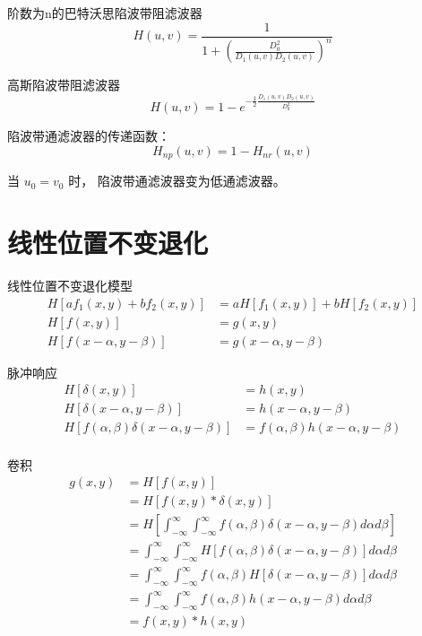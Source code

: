 \documentclass[presentation]{beamer}
\begin{document}
\begin{frame}[label={sec:orgfc7fb33}]{阶数为n的巴特沃思陷波带阻滤波器}
\[ H(u,v)=\frac{1}{1+\left(\frac{D_0^2}{D_1(u,v)D_2(u,v)}\right)^n} \]
\end{frame}

\begin{frame}[label={sec:orgc35f731}]{高斯陷波带阻滤波器}
\[ H(u,v)=1-e^{-\frac{1}{2}\frac{D_1(u,v)D_2(u,v)}{D_0^2}} \]
\end{frame}

\begin{frame}[label={sec:orge88af29}]{陷波带通滤波器的传递函数：}
\[  H_{np}(u,v)=1-H_{nr}(u,v) \]


当 \(u_0=v_0\) 时， 陷波带通滤波器变为低通滤波器。
\end{frame}

\section{线性位置不变退化}
\label{sec:org2271933}
\begin{frame}[label={sec:orgb8091e0}]{线性位置不变退化模型}
\begin{align*}
 H[af_1(x,y)+bf_2(x,y)] &= aH[f_1(x,y)]+bH[f_2(x,y)] \\
  H[f(x,y)] &= g(x,y) \\
 H[f(x-\alpha,y-\beta)] &= g(x-\alpha,y-\beta)
\end{align*}
\end{frame}

\begin{frame}[label={sec:org6517c26}]{脉冲响应}
\begin{align*}
H[\delta(x,y)] &= h(x,y) \\
H[\delta(x-\alpha,y-\beta)] &= h(x-\alpha,y-\beta) \\
H[f(\alpha,\beta)\delta(x-\alpha,y-\beta)] &=f(\alpha,\beta)h(x-\alpha,y-\beta) \\
\end{align*}
\end{frame}

\begin{frame}[label={sec:orgd3b21ba}]{卷积}
\begin{align*}
g(x,y) &=H[f(x,y)] \\
&= H[f(x,y)*\delta(x,y)] \\
&= H\left[\int_{-\infty}^{\infty}\int_{-\infty}^{\infty} f(\alpha,\beta)\delta(x-\alpha,y-\beta) d\alpha d\beta\right] \\
&= \int_{-\infty}^{\infty}\int_{-\infty}^{\infty} H[f(\alpha,\beta)\delta(x-\alpha,y-\beta)] d\alpha d\beta \\
&= \int_{-\infty}^{\infty}\int_{-\infty}^{\infty} f(\alpha,\beta)H[\delta(x-\alpha,y-\beta)] d\alpha d\beta \\
&= \int_{-\infty}^{\infty}\int_{-\infty}^{\infty} f(\alpha,\beta)h(x-\alpha,y-\beta)d\alpha d\beta \\
&= f(x,y)*h(x,y)
\end{align*}
\end{frame}
\end{document}
